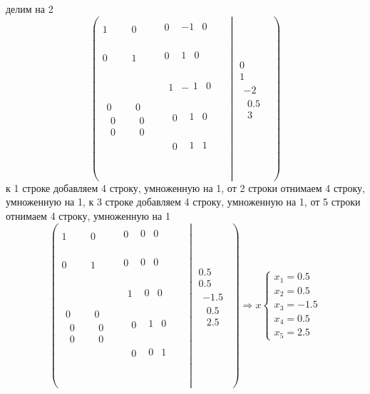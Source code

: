 \documentclass{article}
\begin{document}
 делим на 2$$
  \left(\begin{matrix}1&0&\begin{matrix}0&\begin{matrix}-1&0\\\end{matrix}\\\end{matrix}\\0&1&\begin{matrix}0&\begin{matrix}1&0\\\end{matrix}\\\end{matrix}\\\begin{matrix}0\\\begin{matrix}0\\0\\\end{matrix}\\\end{matrix}&\begin{matrix}0\\\begin{matrix}0\\0\\\end{matrix}\\\end{matrix}&\begin{matrix}\begin{matrix}1&-\begin{matrix}1&0\\\end{matrix}\\\end{matrix}\\\begin{matrix}\begin{matrix}0&\begin{matrix}1&0\\\end{matrix}\\\end{matrix}\\\begin{matrix}0&\begin{matrix}1&1\\\end{matrix}\\\end{matrix}\\\end{matrix}\\\end{matrix}\\\end{matrix}\middle|\begin{matrix}0\\1\\\begin{matrix}-2\\\begin{matrix}0.5\\3\\\end{matrix}\\\end{matrix}\\\end{matrix}\right)$$
к 1 строке добавляем 4 строку, умноженную на 1, от 2 строки отнимаем 4 строку, умноженную на 1, к 3 строке добавляем 4 строку, умноженную на 1, от 5 строки отнимаем 4 строку, умноженную на 1$$
  \left(\begin{matrix}1&0&\begin{matrix}0&\begin{matrix}0&0\\\end{matrix}\\\end{matrix}\\0&1&\begin{matrix}0&\begin{matrix}0&0\\\end{matrix}\\\end{matrix}\\\begin{matrix}0\\\begin{matrix}0\\0\\\end{matrix}\\\end{matrix}&\begin{matrix}0\\\begin{matrix}0\\0\\\end{matrix}\\\end{matrix}&\begin{matrix}\begin{matrix}1&\begin{matrix}0&0\\\end{matrix}\\\end{matrix}\\\begin{matrix}\begin{matrix}0&\begin{matrix}1&0\\\end{matrix}\\\end{matrix}\\\begin{matrix}0&\begin{matrix}0&1\\\end{matrix}\\\end{matrix}\\\end{matrix}\\\end{matrix}\\\end{matrix}\middle|\begin{matrix}0.5\\0.5\\\begin{matrix}-1.5\\\begin{matrix}0.5\\2.5\\\end{matrix}\\\end{matrix}\\\end{matrix}\right)\Rightarrow x
  \left\{\begin{array}{l}
    x_1=0.5  \\
    x_2=0.5  \\
    x_3=-1.5 \\
    x_4=0.5  \\
    x_5=2.5
  \end{array}\right.
$$
$$
$$$$
\end{document}
